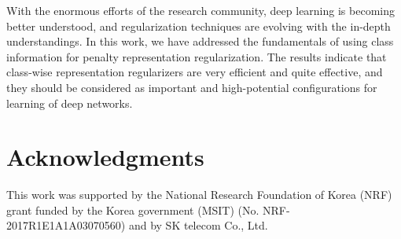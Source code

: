 \documentclass[letterpaper]{article} %
\begin{document}
With the enormous efforts of the research community, deep learning is becoming better understood, and regularization techniques are evolving with the in-depth understandings. In this work, we have addressed the fundamentals of using class information for penalty representation regularization. The results indicate that class-wise representation regularizers are very efficient and quite effective, and they should be considered as important and high-potential configurations for learning of deep networks.

\section*{Acknowledgments}
This work was supported by the National Research Foundation of Korea (NRF) grant funded by the Korea government (MSIT) (No. NRF-2017R1E1A1A03070560) and by SK telecom Co., Ltd.




\clearpage  %
\end{document}
